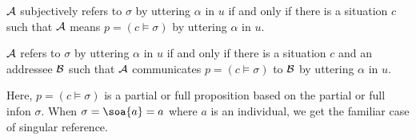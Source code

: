 


\begin{definition}
$\cal A$ subjectively refers to $\sigma$ by uttering $\alpha$ in $u$ if and only if there is a situation $c$ such that $\cal A$ means $p = (c \vDash \sigma)$ by uttering $\alpha$ in $u$.
\label{def:subjectively refers}
\end{definition}


\begin{definition}
$\cal A$ refers to $\sigma$ by uttering $\alpha$ in $u$ if and only if there is a situation $c$ and an addressee $\cal B$ such that $\cal A$ communicates $p = (c \vDash \sigma)$ to $\cal B$ by uttering $\alpha$ in $u$.
\label{def:refers}
\end{definition}

\noindent Here, $p = (c \vDash \sigma)$ is a partial or full proposition based on the partial or full infon $\sigma$. When $\sigma = \soa{a} = a$ where $a$ is an individual, we get the familiar case of singular reference. 



%
%
%
